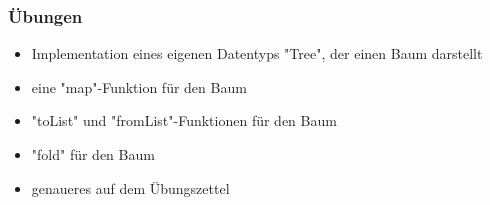 \documentclass[10pt]{beamer}
\begin{document}
\begin{frame}[fragile]
 \frametitle{Übungen}
 \begin{itemize}
  \item Implementation eines eigenen Datentyps "Tree", der einen Baum darstellt
  \pause
  \item eine "map"-Funktion für den Baum
  \pause
  \item "toList" und "fromList"-Funktionen für den Baum
  \pause
  \item "fold" für den Baum
  \pause
  \item genaueres auf dem Übungszettel
 \end{itemize}
\end{frame}

\end{document}
